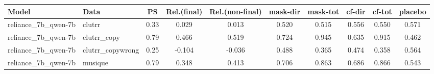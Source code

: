 \begin{tabular}{llcccccccc}
\toprule
Model & Data & PS & Rel.(final) & Rel.(non-final) & mask-dir & mask-tot & cf-dir & cf-tot & placebo \\
\midrule
reliance_7b_qwen-7b & clutrr & 0.33 & 0.029 & 0.013 & 0.520 & 0.515 & 0.556 & 0.550 & 0.571 \\
reliance_7b_qwen-7b & clutrr_copy & 0.79 & 0.466 & 0.519 & 0.724 & 0.945 & 0.635 & 0.915 & 0.462 \\
reliance_7b_qwen-7b & clutrr_copywrong & 0.25 & -0.104 & -0.036 & 0.488 & 0.365 & 0.474 & 0.358 & 0.564 \\
reliance_7b_qwen-7b & musique & 0.79 & 0.348 & 0.413 & 0.706 & 0.863 & 0.686 & 0.866 & 0.543 \\
\bottomrule
\end{tabular}

